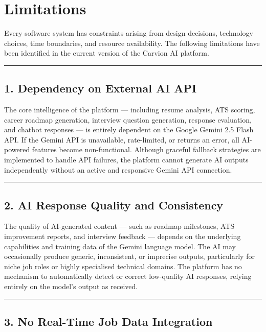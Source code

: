 \documentclass[12pt]{article}
\begin{document}
\clearpage
\section{Limitations}

Every software system has constraints arising from design decisions, technology choices, time boundaries, and resource availability. The following limitations have been identified in the current version of the Carvion AI platform.

\noindent\rule{\textwidth}{0.4pt}

\subsection{1. Dependency on External AI API}

The core intelligence of the platform — including resume analysis, ATS scoring, career roadmap generation, interview question generation, response evaluation, and chatbot responses — is entirely dependent on the Google Gemini 2.5 Flash API. If the Gemini API is unavailable, rate-limited, or returns an error, all AI-powered features become non-functional. Although graceful fallback strategies are implemented to handle API failures, the platform cannot generate AI outputs independently without an active and responsive Gemini API connection.

\noindent\rule{\textwidth}{0.4pt}

\subsection{2. AI Response Quality and Consistency}

The quality of AI-generated content — such as roadmap milestones, ATS improvement reports, and interview feedback — depends on the underlying capabilities and training data of the Gemini language model. The AI may occasionally produce generic, inconsistent, or imprecise outputs, particularly for niche job roles or highly specialised technical domains. The platform has no mechanism to automatically detect or correct low-quality AI responses, relying entirely on the model's output as received.

\noindent\rule{\textwidth}{0.4pt}

\subsection{3. No Real-Time Job Data Integration}
\end{document}
